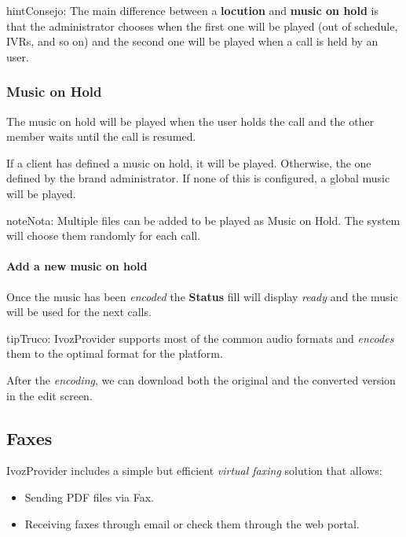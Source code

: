 \documentclass[letterpaper,10pt,spanish]{sphinxmanual}
\begin{document}
\begin{notice}{hint}{Consejo:}
The main difference between a \textbf{locution} and \textbf{music on hold} is
that the administrator chooses when the first one will be played (out of
schedule, IVRs, and so on) and the second one will be played when a call is
held by an user.
\end{notice}


\subsubsection{Music on Hold}
\label{administration_portal/client/vpbx/multimedia/music_on_hold:music-on-hold}\label{administration_portal/client/vpbx/multimedia/music_on_hold::doc}\label{administration_portal/client/vpbx/multimedia/music_on_hold:musiconhold}
The music on hold will be played when the user holds the call and the other
member waits until the call is resumed.

If a client has defined a music on hold, it will be played. Otherwise, the
one defined by the brand administrator. If none of this is configured, a global
music will be played.

\begin{notice}{note}{Nota:}
Multiple files can be added to be played as Music on Hold. The system
will choose them randomly for each call.
\end{notice}
\paragraph{Add a new music on hold}

Once the music has been \emph{encoded} the \textbf{Status} fill will display \emph{ready} and
the music will be used for the next calls.

\begin{notice}{tip}{Truco:}
IvozProvider supports most of the common audio formats and \emph{encodes}
them to the optimal format for the platform.
\end{notice}

After the \emph{encoding}, we can download both the original and the converted
version in the edit screen.


\subsection{Faxes}
\label{administration_portal/client/vpbx/faxes:faxes}\label{administration_portal/client/vpbx/faxes::doc}\label{administration_portal/client/vpbx/faxes:faxing-system}
IvozProvider includes a simple but efficient \emph{virtual faxing} solution that allows:
\begin{itemize}
\item {} 
Sending PDF files via Fax.

\item {} 
Receiving faxes through email or check them through the web portal.

\end{itemize}
\end{document}
